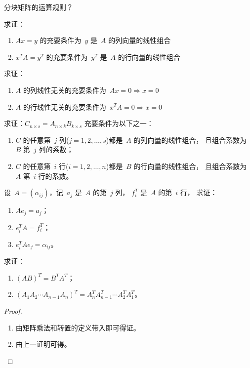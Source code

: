 \documentclass[twoside,openright]{book}
\begin{document}
\begin{CJK*}{UTF8}{}
\begin{quest}
\label{quest:1}
分块矩阵的运算规则？
\end{quest}

\begin{quest}
\label{quest:2}
求证：
\begin{enumerate}
\item
$Ax=y$ 的充要条件为\ $y$ 是\ $A$ 的列向量的线性组合
\item
$x^TA=y^T$ 的充要条件为\ $y^T$ 是\ $A$ 的行向量的线性组合
\end{enumerate}
\end{quest}

\begin{quest}
\label{quest:3}
求证：
\begin{enumerate}
\item
$A$ 的列线性无关的充要条件为\ $Ax=0\Longrightarrow x=0$
\item
$A$ 的行线性无关的充要条件为\ $x^TA=0\Longrightarrow x=0$
\end{enumerate}
\end{quest}

\begin{quest}
\label{quest:4}
求证：$C_{n\times s}=A_{n\times k}B_{k\times s}$ 充要条件为以下之一：
\begin{enumerate}
\item
$C$ 的任意第\ $j$ 列($j=1,2,\dotsc,s$)都是\ $A$ 的列向量的线性组合，
且组合系数为\ $B$ 第\ $j$ 列的系数；
\item
$C$ 的任意第\ $i$ 行($i=1,2,\dotsc,n$)都是\ $B$ 的行向量的线性组合，
且组合系数为\ $A$ 第\ $i$ 行的系数。
\end{enumerate}
\end{quest}

\begin{quest}
\label{quest:5}
设\ $A=(\alpha_{ij})$，记\ $a_j$ 是\ $A$ 的第\ $j$ 列，
$f^T_i$ 是\ $A$ 的第\ $i$ 行，
求证：
\begin{enumerate}
\item
$Ae_j=a_j$；
\item
$e^T_iA=f^T_i$；
\item
$e^T_iAe_j=\alpha_{ij}$。
\end{enumerate}
\end{quest}

\begin{quest}
\label{quest:6}
求证：
\begin{enumerate}
\item
$(AB)^T=B^TA^T$；
\item
$(A_1A_2\dotsm A_{n-1}A_n)^T=A_n^TA_{n-1}^T\dotsm A_2^TA_1^T$。
\end{enumerate}
\end{quest}
%
\begin{proof}
$ $
\begin{enumerate}
\item
由矩阵乘法和转置的定义带入即可得证。
\item
由上一证明可得。
\end{enumerate}
\end{proof}


\end{CJK*}
\end{document}
